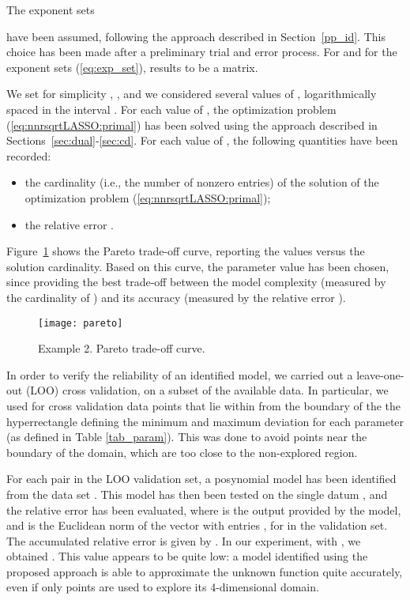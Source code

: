 \documentclass[11pt]{article}
\begin{document}
The exponent sets 

have been assumed, following the approach described in Section~\ref{pp_id}.
This choice has been made after a preliminary trial and error process.
For  and for the exponent sets (\ref{eq:exp_set}), 
results to be a  matrix.

We set for simplicity , , and
we considered several values of , logarithmically spaced
in the interval . For each value of , the optimization
problem (\ref{eq:nnrsqrtLASSO:primal}) has been solved using the
approach described in Sections~\ref{sec:dual}-\ref{sec:cd}. For
each value of , the following quantities have been recorded:
\begin{itemize}
\item the cardinality (i.e., the number of nonzero entries) of the solution
 of the optimization problem (\ref{eq:nnrsqrtLASSO:primal}); 
\item the relative error .
\end{itemize}
\noindent Figure~\ref{pareto:figure2} shows the Pareto trade-off curve,
reporting the  values versus the solution cardinality. Based
on this curve, the parameter value  has been chosen,
since providing the best trade-off between the model complexity (measured
by the cardinality of ) and its accuracy (measured by the relative
error ).

\begin{figure}
\centering
\texttt{[image: pareto]}
\caption{Example 2. Pareto trade-off curve.}
\label{pareto:figure2} 
\end{figure}


In order to verify the reliability of an identified model, we carried
out a leave-one-out (LOO) cross validation, on a subset of the available
data. In particular, we used for cross validation data points 
that lie within  from the boundary of the the hyperrectangle
defining the minimum and maximum deviation for each parameter (as
defined in Table \ref{tab_param}). This was done to avoid points
near the boundary of the  domain, which are too close to the non-explored
region.

For each pair  in the LOO validation set, a posynomial
model has been identified from the data set .
This model has then been tested on the single datum ,
and the relative error 
has been evaluated, where  is the output provided by
the model, and  is the Euclidean norm of the vector
with entries , for  in the validation set. The accumulated
relative error is given by . In our
experiment, with , we obtained . This value
appears to be quite low: a model identified using the proposed approach
is able to approximate the unknown function quite accurately, even
if only  points are used to explore its 4-dimensional domain.
\end{document}
